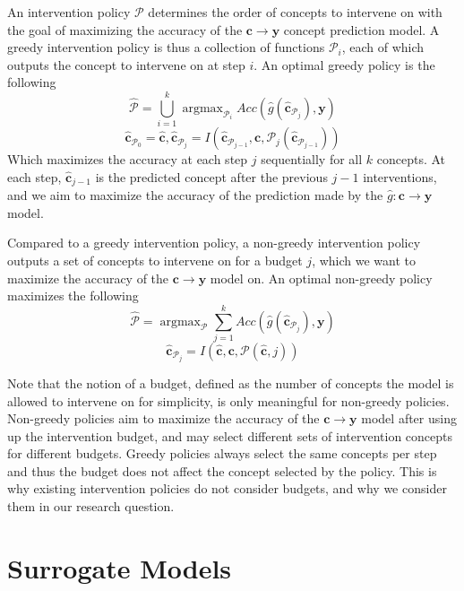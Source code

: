 An intervention policy $\mathcal{P}$ determines the order of concepts to intervene 
on with the goal of maximizing the accuracy of the $\mathbf{c} \to \mathbf{y}$ concept prediction model.
A greedy intervention policy is thus a collection of functions $\mathcal{P}_i$, each
of which outputs the concept to intervene on at step $i$. An optimal greedy policy is the following
\[\hat{\mathcal{P}} = \bigcup_{i=1}^k \mathop{\mathrm{argmax}}_{\mathcal{P}_i} Acc(\hat{g}(\hat{\mathbf{c}}_{\mathcal{P}_j}), \mathbf{y}) \]
\[\hat{\mathbf{c}}_{\mathcal{P}_0} = \hat{\mathbf{c}}, \hat{\mathbf{c}}_{\mathcal{P}_j} = I(\hat{\mathbf{c}}_{\mathcal{P}_{j-1}}, \mathbf{c}, \mathcal{P}_j(\hat{\mathbf{c}}_{\mathcal{P}_{j-1}}))\]
Which maximizes the accuracy at each step $j$ sequentially
for all $k$ concepts. At each
step, $\hat{\mathbf{c}}_{j-1}$ is 
the predicted concept after the previous $j-1$ interventions,
and we aim to maximize the accuracy of the prediction made by the
$\hat{g}: \mathbf{c} \to \mathbf{y}$ model.


Compared to a greedy intervention policy, a non-greedy intervention 
policy outputs a set of concepts to intervene on for a budget $j$,
which we want to maximize the accuracy of the $\mathbf{c} \to \mathbf{y}$ model on. 
An optimal non-greedy policy maximizes the following
\[\hat{\mathcal{P}} = \mathop{\mathrm{argmax}}_{\mathcal{P}} \sum_{j=1}^k Acc(\hat{g}(\hat{\mathbf{c}}_{\mathcal{P}_j}), \mathbf{y}) \]
\[\hat{\mathbf{c}}_{\mathcal{P}_j} = I(\hat{\mathbf{c}}, \mathbf{c}, \mathcal{P}(\hat{\mathbf{c}}, j))\]

Note that the notion of a budget, defined as the number
of concepts the model is allowed to intervene on for simplicity, is only
meaningful for non-greedy policies. Non-greedy policies aim
to maximize the accuracy of the $\mathbf{c} \to \mathbf{y}$ model after using up the intervention budget,
and may select different sets of intervention concepts 
for different budgets. Greedy policies always select the same
concepts per step and thus the budget does not 
affect the concept selected by the policy.
This is why existing intervention policies do not consider
budgets, and why we consider them in our research question.


\section{Surrogate Models}\label{method:surrogate}

